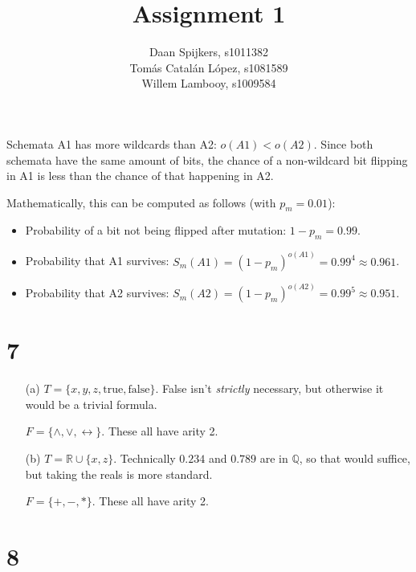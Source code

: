 \documentclass{scrartcl}
\title{Assignment 1}
\author{Daan Spijkers, s1011382\\ Tomás Catalán López, s1081589\\ Willem Lambooy, s1009584}
\begin{document}
\maketitle

\section{}
Schemata A1 has more wildcards than A2: $o(A1) < o(A2)$. Since both schemata have the same amount of bits, the chance of a non-wildcard bit flipping in A1 is less than the chance of that happening in A2.

Mathematically, this can be computed as follows (with $p_m=0.01$):
\begin{itemize}
  \item Probability of a bit not being flipped after mutation: $1-p_m=0.99$.
  \item Probability that A1 survives: $S_m(A1)=(1-p_m)^{o(A1)}=0.99^4\approx0.961$.
  \item Probability that A2 survives: $S_m(A2)=(1-p_m)^{o(A2)}=0.99^5\approx0.951$.
\end{itemize}

\section*{7}
\begin{itemize}
  \item[(a)]
    $T = \{x, y, z, \text{true}, \text{false}\}$. False isn't
    \emph{strictly} necessary, but otherwise it would be a trivial
    formula.

    $F = \{\land, \lor, \leftrightarrow\}$. These all have arity 2.

  \item[(b)]
    $T = \mathbb{R} \cup \{x, z\}$. Technically $0.234$ and $0.789$ are in
    $\mathbb{Q}$, so that would suffice, but taking the reals is more
    standard.

    $F = \{+, -, *\}$. These all have arity 2.

\end{itemize}

\section*{8}
\end{document}
